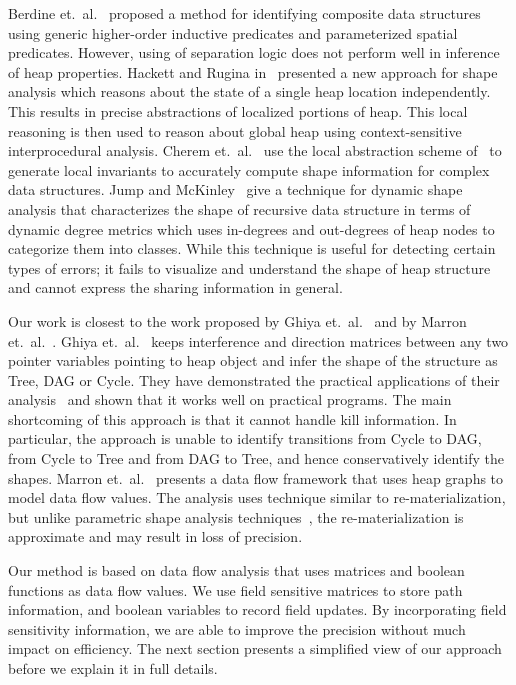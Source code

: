 \documentclass{sig-alternate}
\begin{document}
Berdine et.~al.~\cite{berdine07shape} proposed a method
    for identifying composite data structures using generic
    higher-order inductive predicates and parameterized
    spatial predicates.  However, using of separation logic
    does not perform well in inference of heap properties.
Hackett and Rugina in~\cite{hackett05region} presented a new
approach for shape analysis which reasons about the state of
a single heap location independently. This results in precise
abstractions of localized portions of heap. This local
reasoning is then used to reason about global heap using
context-sensitive interprocedural analysis.  Cherem
et.~al.~\cite{cherem07doubly} use the local abstraction
scheme of~\cite{hackett05region} to generate local invariants
to accurately compute shape information for complex data
structures.
%
Jump and McKinley~\cite{maria09dynamic} give a technique for
dynamic shape analysis that characterizes the shape of
recursive data structure in terms of dynamic degree metrics
which uses in-degrees and out-degrees of heap nodes to
categorize them into classes. While this technique is useful
for detecting certain types of errors; it fails to visualize
and understand the shape of heap structure and cannot express
the sharing information in general.

Our work is closest to the work proposed by Ghiya
et.~al.~\cite{Ghiya96} and by Marron
et.~al.~\cite{marron06static}.  Ghiya et.~al.~\cite{Ghiya96}
keeps interference and direction matrices between any two
pointer variables pointing to heap object and infer the shape
of the structure as Tree, DAG or Cycle. They have
demonstrated the practical applications of their
analysis~\cite{Ghiya98a,Ghiya98b}
and shown that it works well on practical programs.  The main
shortcoming of this approach is that it cannot handle kill
information. In particular, the approach is unable to
identify transitions from Cycle to DAG, from Cycle to Tree
and from DAG to Tree, and hence conservatively identify the
shapes.
%
Marron et.~al.~\cite{marron06static} presents a data flow
framework that uses heap graphs to model data flow
values. The analysis uses technique similar to
re-materialization, but unlike parametric shape analysis
techniques~\cite{Sagiv02toplas}, the
re-materialization is approximate and may result in loss of
precision. 

Our method is based on data flow analysis that uses matrices
and boolean functions as data flow values. We use field
sensitive matrices to store path information, and boolean
variables to record field updates. By incorporating field
sensitivity information, we are able to improve the precision
without much impact on efficiency. The next section presents
a simplified view of our approach before we explain it in
full details.
\end{document}
